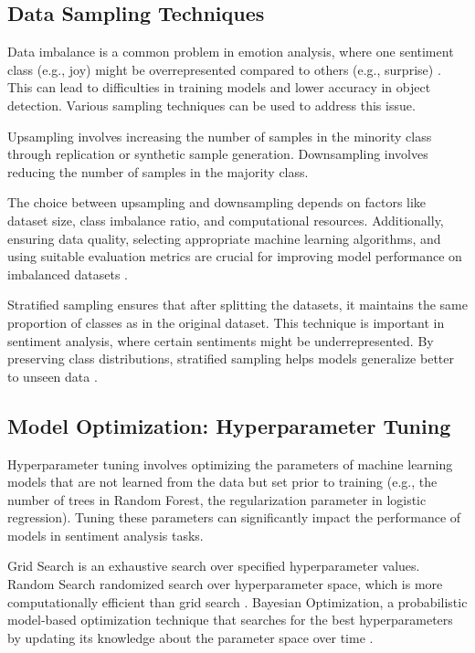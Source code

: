 \subsection{Data Sampling Techniques}

Data imbalance is a common problem in emotion analysis, where one sentiment class (e.g., joy) might be overrepresented compared to others (e.g., surprise) \cite{Kaur2023}. This can lead to difficulties in training models and lower accuracy in object detection. Various sampling techniques can be used to address this issue.

Upsampling involves increasing the number of samples in the minority class through replication or synthetic sample generation. Downsampling involves reducing the number of samples in the majority class.

The choice between upsampling and downsampling depends on factors like dataset size, class imbalance ratio, and computational resources. Additionally, ensuring data quality, selecting appropriate machine learning algorithms, and using suitable evaluation metrics are crucial for improving model performance on imbalanced datasets \cite{analyticsvidhya2024}.

Stratified sampling ensures that after splitting the datasets, it maintains the same proportion of classes as in the original dataset. This technique is important in sentiment analysis, where certain sentiments might be underrepresented. By preserving class distributions, stratified sampling helps models generalize better to unseen data \cite{shi2015}.

\subsection{Model Optimization: Hyperparameter Tuning}

Hyperparameter tuning involves optimizing the parameters of machine learning models that are not learned from the data but set prior to training (e.g., the number of trees in Random Forest, the regularization parameter in logistic regression). Tuning these parameters can significantly impact the performance of models in sentiment analysis tasks.

Grid Search is an exhaustive search over specified hyperparameter values.
Random Search randomized search over hyperparameter space, which is more computationally efficient than grid search \cite{chawla2024}.
Bayesian Optimization, a probabilistic model-based optimization technique that searches for the best hyperparameters by updating its knowledge about the parameter space over time \cite{chawla20241}.

